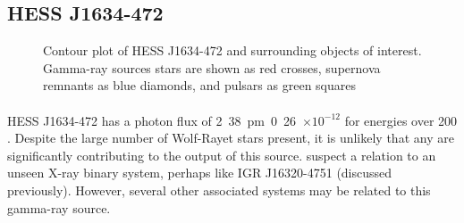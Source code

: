\documentclass[a4paper, titlepage, oneside]{article}
\newcommand{\e}[1]{\ensuremath{\times 10^{#1}}}
\newcommand{\photon}{\mathrm{ph}}
\begin{document}
\begin{multicols}{2}
\subsection{HESS J1634-472}
\label{sec:hess34}

\begin{figure}[H]
  \centering
  \caption{Contour plot of HESS J1634-472 and surrounding objects of interest. Gamma-ray sources stars are shown as red crosses, supernova remnants as blue diamonds, and pulsars as green squares}
  \label{fig:hess34}
\end{figure}

\paragraph{}
HESS J1634-472 has a photon flux of \unit{2.38\pm0.26\e{-12}}{\photon\usk\centi\metre\rpsquared\usk\reciprocal\second} for energies over \unit{200}{\giga\electronvolt} \parencite{Aharonian:2006}. Despite the large number of Wolf-Rayet stars present, it is unlikely that any are significantly contributing to the output of this source. \textcite{Aharonian:2006} suspect a relation to an unseen X-ray binary system, perhaps like IGR J16320-4751 (discussed previously). However, several other associated systems may be related to this gamma-ray source.


\end{multicols}
\end{document}
